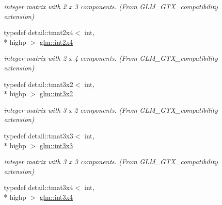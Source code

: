 \begin{DoxyCompactItemize}
\begin{DoxyCompactList}\small\item\em integer matrix with 2 x 3 components. (From G\-L\-M\-\_\-\-G\-T\-X\-\_\-compatibility extension) \end{DoxyCompactList}\item 
\hypertarget{group__gtx__compatibility_ga145a388c0d988490d6ce901a664faf50}{typedef detail\-::tmat2x4$<$ int, \\*
highp $>$ \hyperlink{group__gtx__compatibility_ga145a388c0d988490d6ce901a664faf50}{glm\-::int2x4}}\label{group__gtx__compatibility_ga145a388c0d988490d6ce901a664faf50}

\begin{DoxyCompactList}\small\item\em integer matrix with 2 x 4 components. (From G\-L\-M\-\_\-\-G\-T\-X\-\_\-compatibility extension) \end{DoxyCompactList}\item 
\hypertarget{group__gtx__compatibility_ga2b1f3046fb4692c0c2f76b3933389868}{typedef detail\-::tmat3x2$<$ int, \\*
highp $>$ \hyperlink{group__gtx__compatibility_ga2b1f3046fb4692c0c2f76b3933389868}{glm\-::int3x2}}\label{group__gtx__compatibility_ga2b1f3046fb4692c0c2f76b3933389868}

\begin{DoxyCompactList}\small\item\em integer matrix with 3 x 2 components. (From G\-L\-M\-\_\-\-G\-T\-X\-\_\-compatibility extension) \end{DoxyCompactList}\item 
\hypertarget{group__gtx__compatibility_ga8773c9f240dcac9f28d1afef71f7f779}{typedef detail\-::tmat3x3$<$ int, \\*
highp $>$ \hyperlink{group__gtx__compatibility_ga8773c9f240dcac9f28d1afef71f7f779}{glm\-::int3x3}}\label{group__gtx__compatibility_ga8773c9f240dcac9f28d1afef71f7f779}

\begin{DoxyCompactList}\small\item\em integer matrix with 3 x 3 components. (From G\-L\-M\-\_\-\-G\-T\-X\-\_\-compatibility extension) \end{DoxyCompactList}\item 
\hypertarget{group__gtx__compatibility_ga7cb1c0960d6551c34c666ad5829e9c65}{typedef detail\-::tmat3x4$<$ int, \\*
highp $>$ \hyperlink{group__gtx__compatibility_ga7cb1c0960d6551c34c666ad5829e9c65}{glm\-::int3x4}}\label{group__gtx__compatibility_ga7cb1c0960d6551c34c666ad5829e9c65}


\end{DoxyCompactItemize}

